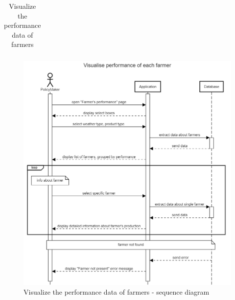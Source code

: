 \begin{table}[H]
\begin{tabular}{|l|p{}|}
    \end{tabular}
    \caption{\label{tab:visualize_farmer_performance}Visualize the performance data of farmers} 
\end{table}

\begin{figure}[H]
    \centering
    \includegraphics[scale=0.5]{Images/Sequence diagrams/SE2 - visualize performance (pm).png}
    \caption{Visualize the performance data of farmers - sequence diagram}
    \label{fig:my_label}
\end{figure}

